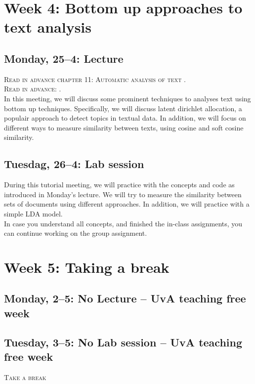 \section*{Week 4: Bottom up approaches to text analysis}

\subsection*{Monday, 25--4: Lecture}
\textsc{Read in advance chapter 11: Automatic analysis of text \cite{van2021computational}.} \\
\textsc{Read in advance: \cite{Brinberg2021}.} \\

In this meeting, we will discuss some prominent techniques to analyses text using bottom up techniques. Specifically, we will discuss latent dirichlet allocation, a populair approach to detect topics in textual data. In addition, we will focus on different ways to measure similarity between texts, using cosine and soft cosine similarity. 

\subsection*{Tuesdag, 26--4: Lab session}
During this tutorial meeting, we will practice with the concepts and code as introduced in Monday's lecture. We will try to measure the similarity between sets of documents using different approaches. In addition, we will practice with a simple LDA model. \\
In case you understand all concepts, and finished the in-class assignments, you can continue working on the group assignment. 

\section*{Week 5: Taking a break}

\subsection*{Monday, 2--5: No Lecture -- UvA teaching free week}

\subsection*{Tuesday, 3--5: No Lab session -- UvA teaching free week}

\textsc{ Take a break}\\

